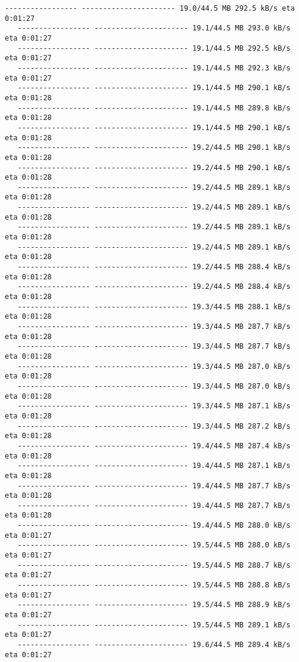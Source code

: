 \documentclass[11pt]{article}
\begin{document}
\begin{Verbatim}[commandchars=\\\{\}]
   ----------------- ---------------------- 19.0/44.5 MB 292.5 kB/s eta 0:01:27
   ----------------- ---------------------- 19.1/44.5 MB 293.0 kB/s eta 0:01:27
   ----------------- ---------------------- 19.1/44.5 MB 292.5 kB/s eta 0:01:27
   ----------------- ---------------------- 19.1/44.5 MB 292.3 kB/s eta 0:01:27
   ----------------- ---------------------- 19.1/44.5 MB 290.1 kB/s eta 0:01:28
   ----------------- ---------------------- 19.1/44.5 MB 289.8 kB/s eta 0:01:28
   ----------------- ---------------------- 19.1/44.5 MB 290.1 kB/s eta 0:01:28
   ----------------- ---------------------- 19.2/44.5 MB 290.1 kB/s eta 0:01:28
   ----------------- ---------------------- 19.2/44.5 MB 290.1 kB/s eta 0:01:28
   ----------------- ---------------------- 19.2/44.5 MB 289.1 kB/s eta 0:01:28
   ----------------- ---------------------- 19.2/44.5 MB 289.1 kB/s eta 0:01:28
   ----------------- ---------------------- 19.2/44.5 MB 289.1 kB/s eta 0:01:28
   ----------------- ---------------------- 19.2/44.5 MB 289.1 kB/s eta 0:01:28
   ----------------- ---------------------- 19.2/44.5 MB 288.4 kB/s eta 0:01:28
   ----------------- ---------------------- 19.2/44.5 MB 288.4 kB/s eta 0:01:28
   ----------------- ---------------------- 19.3/44.5 MB 288.1 kB/s eta 0:01:28
   ----------------- ---------------------- 19.3/44.5 MB 287.7 kB/s eta 0:01:28
   ----------------- ---------------------- 19.3/44.5 MB 287.7 kB/s eta 0:01:28
   ----------------- ---------------------- 19.3/44.5 MB 287.0 kB/s eta 0:01:28
   ----------------- ---------------------- 19.3/44.5 MB 287.0 kB/s eta 0:01:28
   ----------------- ---------------------- 19.3/44.5 MB 287.1 kB/s eta 0:01:28
   ----------------- ---------------------- 19.3/44.5 MB 287.2 kB/s eta 0:01:28
   ----------------- ---------------------- 19.4/44.5 MB 287.4 kB/s eta 0:01:28
   ----------------- ---------------------- 19.4/44.5 MB 287.1 kB/s eta 0:01:28
   ----------------- ---------------------- 19.4/44.5 MB 287.7 kB/s eta 0:01:28
   ----------------- ---------------------- 19.4/44.5 MB 287.7 kB/s eta 0:01:28
   ----------------- ---------------------- 19.4/44.5 MB 288.0 kB/s eta 0:01:27
   ----------------- ---------------------- 19.5/44.5 MB 288.0 kB/s eta 0:01:27
   ----------------- ---------------------- 19.5/44.5 MB 288.7 kB/s eta 0:01:27
   ----------------- ---------------------- 19.5/44.5 MB 288.8 kB/s eta 0:01:27
   ----------------- ---------------------- 19.5/44.5 MB 288.9 kB/s eta 0:01:27
   ----------------- ---------------------- 19.5/44.5 MB 289.1 kB/s eta 0:01:27
   ----------------- ---------------------- 19.6/44.5 MB 289.4 kB/s eta 0:01:27

\end{Verbatim}
\end{document}
